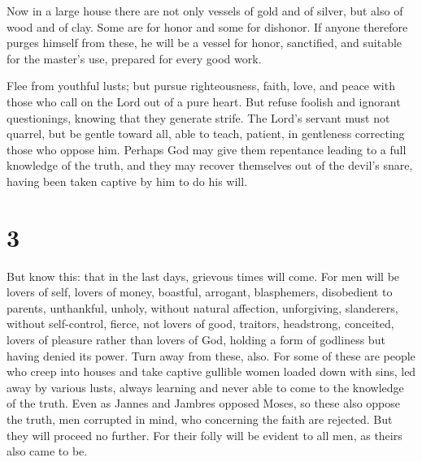  Now in a large house there are not only vessels of gold
and of silver, but also of wood and of clay. Some are for honor and some
for dishonor.  If anyone therefore purges himself from
these, he will be a vessel for honor, sanctified, and suitable for the
master's use, prepared for every good work.

 Flee from youthful lusts; but pursue righteousness, faith,
love, and peace with those who call on the Lord out of a pure heart.
 But refuse foolish and ignorant questionings, knowing that
they generate strife.  The Lord's servant must not quarrel,
but be gentle toward all, able to teach, patient,  in
gentleness correcting those who oppose him. Perhaps God may give them
repentance leading to a full knowledge of the truth,  and
they may recover themselves out of the devil's snare, having been taken
captive by him to do his will.

\hypertarget{section-2}{%
\section{3}\label{section-2}}

 But know this: that in the last days, grievous times will
come.  For men will be lovers of self, lovers of money,
boastful, arrogant, blasphemers, disobedient to parents, unthankful,
unholy,  without natural affection, unforgiving, slanderers,
without self-control, fierce, not lovers of good,  traitors,
headstrong, conceited, lovers of pleasure rather than lovers of God,
 holding a form of godliness but having denied its power.
Turn away from these, also.  For some of these are people
who creep into houses and take captive gullible women loaded down with
sins, led away by various lusts,  always learning and never
able to come to the knowledge of the truth.  Even as Jannes
and Jambres opposed Moses, so these also oppose the truth, men corrupted
in mind, who concerning the faith are rejected.  But they
will proceed no further. For their folly will be evident to all men, as
theirs also came to be.

